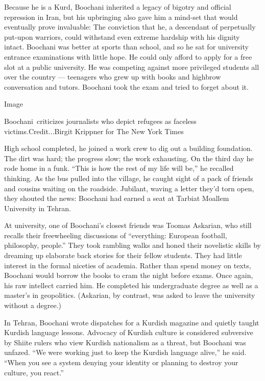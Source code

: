 Because he is a Kurd, Boochani inherited a legacy of bigotry and
official repression in Iran, but his upbringing also gave him a mind-set
that would eventually prove invaluable: The conviction that he, a
descendant of perpetually put-upon warriors, could withstand even
extreme hardship with his dignity intact. Boochani was better at sports
than school, and so he sat for university entrance examinations with
little hope. He could only afford to apply for a free slot at a public
university. He was competing against more privileged students all over
the country --- teenagers who grew up with books and highbrow
conversation and tutors. Boochani took the exam and tried to forget
about it.

Image

Boochani~criticizes journalists who depict refugees as faceless
victims.Credit...Birgit Krippner for The New York Times

High school completed, he joined a work crew to dig out a building
foundation. The dirt was hard; the progress slow; the work exhausting.
On the third day he rode home in a funk. ``This is how the rest of my
life will be,'' he recalled thinking. As the bus pulled into the
village, he caught sight of a pack of friends and cousins waiting on the
roadside. Jubilant, waving a letter they'd torn open, they shouted the
news: Boochani had earned a seat at Tarbiat Moallem University in
Tehran.

At university, one of Boochani's closest friends was Toomas Askarian,
who still recalls their freewheeling discussions of ``everything:
European football, philosophy, people.'' They took rambling walks and
honed their novelistic skills by dreaming up elaborate back stories for
their fellow students. They had little interest in the formal niceties
of academia. Rather than spend money on texts, Boochani would borrow the
books to cram the night before exams. Once again, his raw intellect
carried him. He completed his undergraduate degree as well as a master's
in geopolitics. (Askarian, by contrast, was asked to leave the
university without a degree.)

In Tehran, Boochani wrote dispatches for a Kurdish magazine and quietly
taught Kurdish language lessons. Advocacy of Kurdish culture is
considered subversive by Shiite rulers who view Kurdish nationalism as a
threat, but Boochani was unfazed. ``We were working just to keep the
Kurdish language alive,'' he said. ``When you see a system denying your
identity or planning to destroy your culture, you react.''


